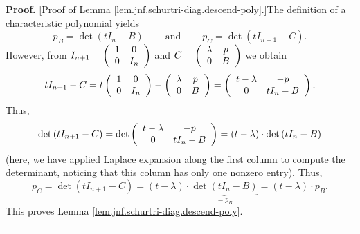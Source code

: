 \documentclass[numbers=enddot,12pt,final,onecolumn,notitlepage]{scrartcl}%
\numberwithin{exer}{subsection}
\theoremstyle{definition}
\newenvironment{proof}[1][Proof]{\noindent\textbf{#1.} }{\ \rule{0.5em}{0.5em}}
\begin{document}
\begin{proof}
[Proof of Lemma \ref{lem.jnf.schurtri-diag.descend-poly}.]The definition of a
characteristic polynomial yields%
\[
p_{B}=\det\left(  tI_{n}-B\right)  \ \ \ \ \ \ \ \ \ \ \text{and}%
\ \ \ \ \ \ \ \ \ \ p_{C}=\det\left(  tI_{n+1}-C\right)  .
\]
However, from $I_{n+1}=\left(
\begin{array}
[c]{cc}%
1 & 0\\
0 & I_{n}%
\end{array}
\right)  $ and $C=\left(
\begin{array}
[c]{cc}%
\lambda & p\\
0 & B
\end{array}
\right)  $ we obtain
\[
tI_{n+1}-C=t\left(
\begin{array}
[c]{cc}%
1 & 0\\
0 & I_{n}%
\end{array}
\right)  -\left(
\begin{array}
[c]{cc}%
\lambda & p\\
0 & B
\end{array}
\right)  =\left(
\begin{array}
[c]{cc}%
t-\lambda & -p\\
0 & tI_{n}-B
\end{array}
\right)  .
\]
Thus,%
\[
\det\left(  tI_{n+1}-C\right)  =\det\left(
\begin{array}
[c]{cc}%
t-\lambda & -p\\
0 & tI_{n}-B
\end{array}
\right)  =\left(  t-\lambda\right)  \cdot\det\left(  tI_{n}-B\right)
\]
(here, we have applied Laplace expansion along the first column to compute the
determinant, noticing that this column has only one nonzero entry). Thus,%
\[
p_{C}=\det\left(  tI_{n+1}-C\right)  =\left(  t-\lambda\right)  \cdot
\underbrace{\det\left(  tI_{n}-B\right)  }_{=p_{B}}=\left(  t-\lambda\right)
\cdot p_{B}.
\]
This proves Lemma \ref{lem.jnf.schurtri-diag.descend-poly}.
\end{proof}
\end{document}
